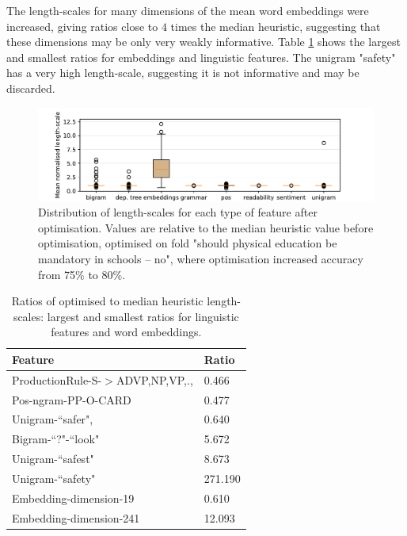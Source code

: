 The length-scales for many dimensions of the mean word embeddings were increased,
giving ratios close to $4$ times the median heuristic, suggesting that these dimensions may be
only very weakly informative. Table \ref{tab:extreme_features} shows the largest
and smallest ratios for embeddings and linguistic features. The unigram "safety" has
a very high length-scale, suggesting it is not informative and may be discarded. 
\begin{figure}
\includegraphics[width=\columnwidth, clip=True, trim=32 0 57 0]{figures/features/boxplot}
\caption{Distribution of length-scales for each type of feature after optimisation. 
Values are relative to the median heuristic value before optimisation, optimised 
on fold "should physical education be mandatory in schools -- no", where 
optimisation increased accuracy from 75\% to 80\%. }
\label{fig:boxplot}
\end{figure}
\begin{table}
\small
  \begin{tabularx}{\columnwidth}{l | X }
  Feature & Ratio\\
  \hline
  ProductionRule-S-$>$ADVP,NP,VP,., & 0.466 \nonumber\\
  Pos-ngram-PP-O-CARD & 0.477 \nonumber\\
  Unigram-``safer", & 0.640 \nonumber\\
  \hline
  Bigram-``?"-``look" & 5.672 \nonumber\\
  Unigram-``safest" & 8.673 \nonumber\\
  Unigram-``safety" & 271.190 \nonumber\\
  \hline
  Embedding-dimension-19 & 0.610 \nonumber\\
  \hline
  Embedding-dimension-241 & 12.093 \nonumber\\
  \end{tabularx}
  \caption{Ratios of optimised to median heuristic length-scales: largest and smallest
  ratios for linguistic features and word embeddings.}
  \label{tab:extreme_features}
\end{table}


